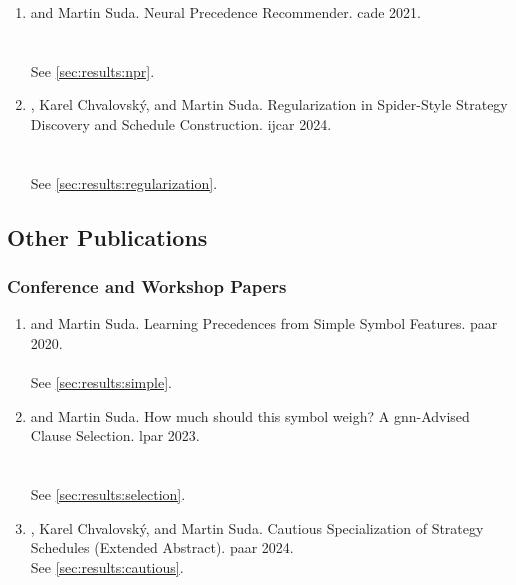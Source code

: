 \begin{enumerate}

\item {} and Martin Suda.
Neural Precedence Recommender.
\Acrfull{cade} 2021.
\cite{DBLP:conf/cade/Bartek021}
\\ 
\\ 
\\ See \cref{sec:results:npr}.

\item {}, Karel Chvalovský, and Martin Suda.
Regularization in Spider-Style Strategy Discovery and Schedule Construction.
\Acrfull{ijcar} 2024.
\cite{DBLP:conf/ijcar/BartekCS24}
\\ 
\\ 
\\ See \cref{sec:results:regularization}.

\end{enumerate}

\subsection{Other Publications}

\subsubsection{Conference and Workshop Papers}

\begin{enumerate}

\item {} and Martin Suda.
Learning Precedences from Simple Symbol Features.
\Acrfull{paar} 2020.
\cite{DBLP:conf/cade/Bartek020}
\\ 
\\ See \cref{sec:results:simple}.

\item {} and Martin Suda.
How much should this symbol weigh? A \acrshort{gnn}-Advised Clause Selection.
\Acrfull{lpar} 2023.
\cite{DBLP:conf/lpar/Bartek023}
\\ 
\\ 
\\ See \cref{sec:results:selection}.

\item {}, Karel Chvalovský, and Martin Suda.
Cautious Specialization of Strategy Schedules (Extended Abstract).
\Acrfull{paar} 2024.
\cite{DBLP:conf/paar/BartekC024}
\\ See \cref{sec:results:cautious}.

\end{enumerate}

